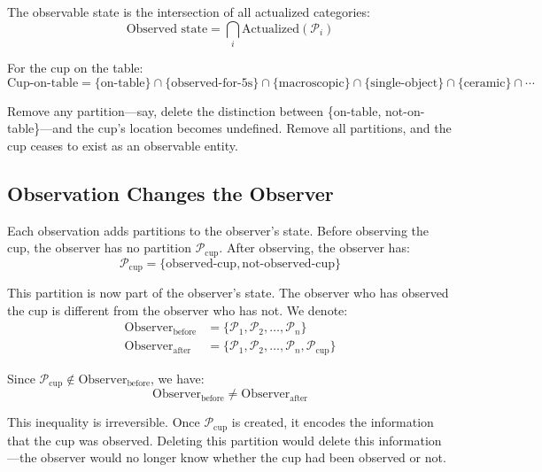 \documentclass[twocolumn,10pt]{article}
\theoremstyle{definition}
\theoremstyle{remark}
\begin{document}
\vspace{0.2cm}
\noindent The observable state is the intersection of all actualized categories:
\begin{equation}
\label{eq:state_intersection}
\text{Observed state} = \bigcap_{i} \text{Actualized}(\mathcal{P}_i)
\end{equation}

\noindent For the cup on the table:
\begin{equation}
\text{Cup-on-table} = \{\text{on-table}\} \cap \{\text{observed-for-5s}\} \cap \{\text{macroscopic}\} \cap \{\text{single-object}\} \cap \{\text{ceramic}\} \cap \cdots
\end{equation}

\noindent Remove any partition—say, delete the distinction between \{on-table, not-on-table\}—and the cup's location becomes undefined. Remove all partitions, and the cup ceases to exist as an observable entity.

\subsection{Observation Changes the Observer}

Each observation adds partitions to the observer's state. Before observing the cup, the observer has no partition $\mathcal{P}_{\text{cup}}$. After observing, the observer has:
\begin{equation}
\mathcal{P}_{\text{cup}} = \{\text{observed-cup}, \text{not-observed-cup}\}
\end{equation}

\noindent This partition is now part of the observer's state. The observer who has observed the cup is different from the observer who has not. We denote:
\begin{align}
\text{Observer}_{\text{before}} &= \{\mathcal{P}_1, \mathcal{P}_2, \ldots, \mathcal{P}_n\} \\
\text{Observer}_{\text{after}} &= \{\mathcal{P}_1, \mathcal{P}_2, \ldots, \mathcal{P}_n, \mathcal{P}_{\text{cup}}\}
\end{align}

\noindent Since $\mathcal{P}_{\text{cup}} \notin \text{Observer}_{\text{before}}$, we have:
\begin{equation}
\text{Observer}_{\text{before}} \neq \text{Observer}_{\text{after}}
\end{equation}

\noindent This inequality is irreversible. Once $\mathcal{P}_{\text{cup}}$ is created, it encodes the information that the cup was observed. Deleting this partition would delete this information—the observer would no longer know whether the cup had been observed or not.
\end{document}
